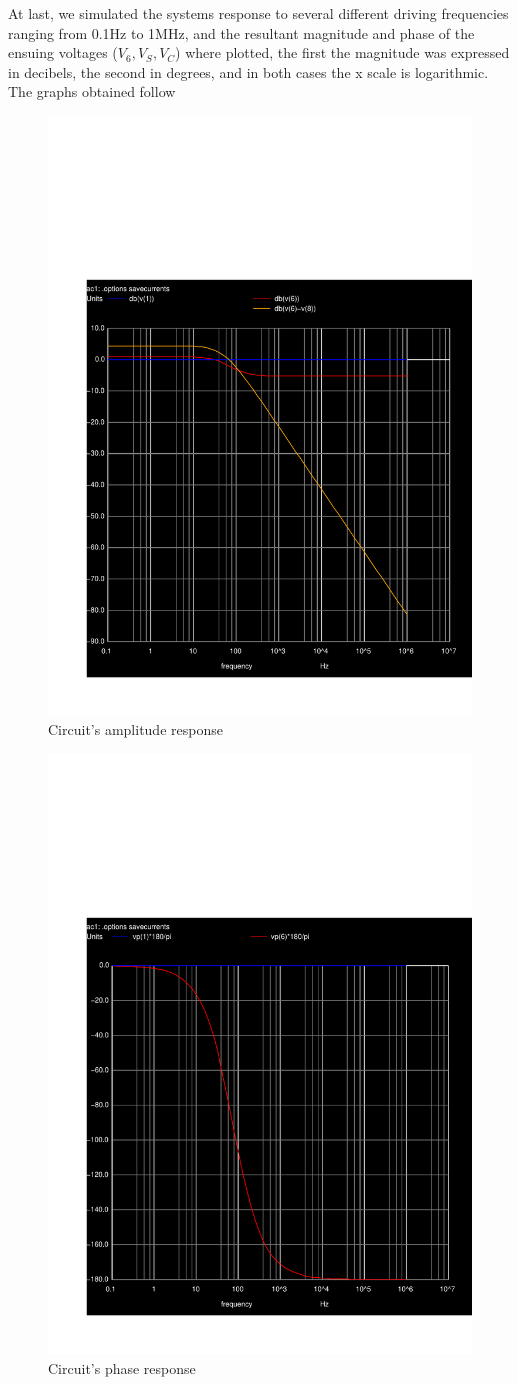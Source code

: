 At last, we simulated the systems response to several different driving frequencies ranging from 0.1Hz to 1MHz, and the resultant magnitude and phase of the ensuing voltages ($V_6,V_S,V_C$) where plotted, the first the magnitude was expressed in decibels, the second in degrees, and in both cases the x scale is logarithmic. The graphs obtained follow


\begin{figure}[h] \centering
\includegraphics[width=0.6\linewidth]{../sim/5/acm.pdf}
\caption{Circuit's amplitude response}
\label{fig:Amp response}
\end{figure}

\begin{figure}[h] \centering
\includegraphics[width=0.6\linewidth]{../sim/5/freq.pdf}
\caption{Circuit's phase response}
\label{fig:Phase response}
\end{figure}







